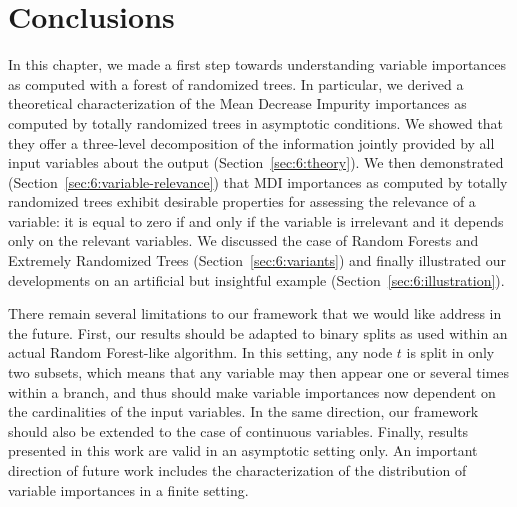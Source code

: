 


\section{Conclusions}

In this chapter, we made a first step towards understanding variable importances as
computed with a forest of randomized trees. In particular, we derived a
theoretical characterization of the Mean Decrease Impurity importances as
computed by totally randomized trees in asymptotic  conditions.  We showed that
they offer a three-level decomposition of the information jointly provided by
all input variables about the output (Section~\ref{sec:6:theory}). We then demonstrated
(Section~\ref{sec:6:variable-relevance}) that MDI importances as computed by totally randomized
trees exhibit desirable properties for  assessing the relevance of a variable:
it is equal to zero if and only if the variable is irrelevant and it depends
only on the relevant variables. We discussed the case of Random Forests and
Extremely Randomized Trees (Section~\ref{sec:6:variants}) and finally illustrated our
developments on an artificial but insightful example (Section~\ref{sec:6:illustration}).

There remain several limitations to our framework that we would like address in
the future. First, our results should be adapted to binary splits as used within
an actual Random Forest-like algorithm. In this setting, any node $t$ is split
in only two subsets, which means that any variable may then appear one or
several times within a branch, and thus should make variable importances now
dependent on the cardinalities of the input variables. In the same direction,
our framework should also be extended to the case of continuous variables.
Finally, results presented in this work are valid in an asymptotic setting only.
An important direction of future work includes the characterization of the
distribution of variable importances in a finite setting.
